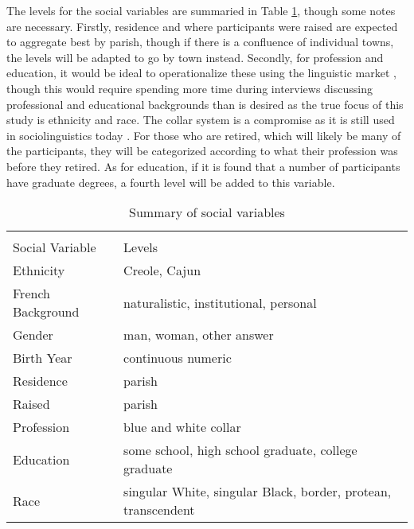     The levels for the social variables are summaried in Table \ref{tab:social_vars}, though some notes are necessary.
    Firstly, residence and where participants were raised are expected to aggregate best by parish, though if there is a confluence of individual towns, the levels will be adapted to go by town instead.
    Secondly, for profession and education, it would be ideal to operationalize these using the linguistic market \parencite{sankoff_linguistic_1978}, though this would require spending more time during interviews discussing professional and educational backgrounds than is desired as the true focus of this study is ethnicity and race.
    The collar system is a compromise as it is still used in sociolinguistics today \parencite[e.g.,][]{dodsworth_social_2017, forrest_community_2015}.
    For those who are retired, which will likely be many of the participants, they will be categorized according to what their profession was before they retired.
    As for education, if it is found that a number of participants have graduate degrees, a fourth level will be added to this variable.

    \begin{table}[tbhp]
      \centering
      \caption{Summary of social variables}
      \label{tab:social_vars}
      \begin{tabular}{l l}
                          & \\
        Social Variable   & Levels \\
        \hline
        Ethnicity         & Creole, Cajun \\
        French Background & naturalistic, institutional, personal \\
        Gender            & man, woman, other answer \\
        Birth Year        & continuous numeric \\
        Residence         & parish \\
        Raised            & parish \\
        Profession        & blue and white collar \\
        Education         & some school, high school graduate, college graduate \\
        Race              & singular White, singular Black, border, protean, transcendent
      \end{tabular}
    \end{table}

